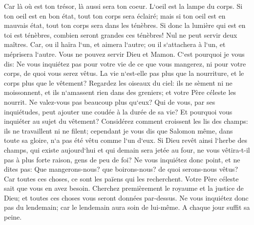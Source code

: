\verse Car là où est ton trésor, là aussi sera ton coeur. 
\verse L`oeil est la lampe du corps. Si ton oeil est en bon état, tout ton corps sera éclairé; 
\verse mais si ton oeil est en mauvais état, tout ton corps sera dans les ténèbres. Si donc la lumière qui est en toi est ténèbres, combien seront grandes ces ténèbres! 
\verse Nul ne peut servir deux maîtres. Car, ou il haïra l`un, et aimera l`autre; ou il s`attachera à l`un, et méprisera l`autre. Vous ne pouvez servir Dieu et Mamon. 
\verse C`est pourquoi je vous dis: Ne vous inquiétez pas pour votre vie de ce que vous mangerez, ni pour votre corps, de quoi vous serez vêtus. La vie n`est-elle pas plus que la nourriture, et le corps plus que le vêtement? 
\verse Regardez les oiseaux du ciel: ils ne sèment ni ne moissonnent, et ils n`amassent rien dans des greniers; et votre Père céleste les nourrit. Ne valez-vous pas beaucoup plus qu`eux? 
\verse Qui de vous, par ses inquiétudes, peut ajouter une coudée à la durée de sa vie? 
\verse Et pourquoi vous inquiéter au sujet du vêtement? Considérez comment croissent les lis des champs: ils ne travaillent ni ne filent; 
\verse cependant je vous dis que Salomon même, dans toute sa gloire, n`a pas été vêtu comme l`un d`eux. 
\verse Si Dieu revêt ainsi l`herbe des champs, qui existe aujourd`hui et qui demain sera jetée au four, ne vous vêtira-t-il pas à plus forte raison, gens de peu de foi? 
\verse Ne vous inquiétez donc point, et ne dites pas: Que mangerons-nous? que boirons-nous? de quoi serons-nous vêtus? 
\verse Car toutes ces choses, ce sont les païens qui les recherchent. Votre Père céleste sait que vous en avez besoin. 
\verse Cherchez premièrement le royaume et la justice de Dieu; et toutes ces choses vous seront données par-dessus. 
\verse Ne vous inquiétez donc pas du lendemain; car le lendemain aura soin de lui-même. A chaque jour suffit sa peine. 

\chapter{}

